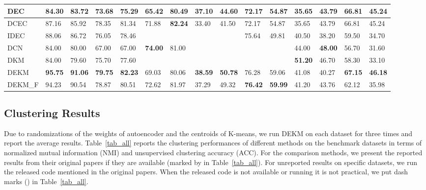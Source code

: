 \begin{table*}[!htb]
\begin{center}
{\begin{tabular}{|l|l|l|l|l|l|l|l|l|l|l|l|l|l|l|}
			DEC    &84.30           &83.72     &73.68     &75.29     &65.42   &80.49 &37.10  &44.60  &72.17    &54.87          &35.65            &43.79          &66.81           &45.24        \\ \hline
			DCEC            &87.16                     &85.92              &78.35              &81.34              &71.88          &\textbf{82.24}            &33.40        &41.50    &72.17    &54.87          &35.65            &43.79          &66.81           &45.24        \\ \hline
			IDEC        &88.06           &86.72     &76.05     &78.46      &             &                &              &           &75.64         &49.81      &40.50        &38.20       &59.50      &34.70   \\ \hline
			DCN         &84.00                   &80.00               &67.00             &67.00               &\textbf{74.00} &81.00       &              &           &            &           &44.00        &\textbf{48.00}      &56.70       &31.60       \\ \hline
DKM                         &84.00            &79.60      &75.70    &77.60     &             &              &              &             &              &          &\textbf{51.20}         &46.70       &58.30       &33.10     \\ \hline
			DEKM                                                             &\textbf{95.75}       & \textbf{91.06} &\textbf{79.75}   &\textbf{82.23}   &69.03   &80.06     &\textbf{38.59}    &\textbf{50.78}     &76.28&59.06&41.08&40.27&\textbf{67.15}&\textbf{46.18}     \\ \hline
			DEKM\_F                                                   &94.23                       &90.54                &78.87          &80.51          &72.62          &81.97          &37.29          &49.32    &\textbf{76.42}&\textbf{59.99}&41.20&43.76&62.12&35.98      \\ \hline
\end{tabular}}
		\label{tab_all}
	\end{center}
\end{table*}

\subsection{Clustering Results}

Due to randomizations of the weights of autoencoder and the centroids of K-means, we run DEKM on each dataset for three times and report the average results. Table~\ref{tab_all} reports the clustering performances of different methods on the benchmark datasets in terms of normalized mutual information (NMI) and unsupervised clustering accuracy (ACC). For the comparison methods, we present the reported results from their original papers if they are available (marked by  in Table~\ref{tab_all}). For unreported results on specific datasets, we run the released code mentioned in the original papers. When the released code is not available or running it is not practical, we put dash marks () in Table~\ref{tab_all}. 

